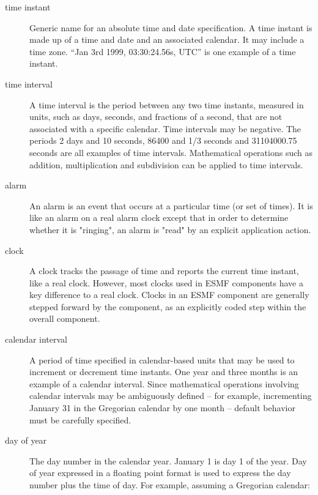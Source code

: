 \label{sec:terms}

\begin{description}

\item [time instant] \label{glos:timeinstant}
Generic name for an absolute time and date specification. A time instant is made 
up of a time and date and an associated calendar. It may include a time zone.
``Jan 3rd 1999, 03:30:24.56s, UTC'' is one example of a time instant.

\item [time interval] \label{glos:timeinterval} A time interval is the
period between any two time instants, measured in units, such as days, 
seconds, and fractions of a second, that are not associated with a specific
calendar.  Time intervals may be negative.  The periods 2 days and 10 seconds, 
86400 and 1/3 seconds and 31104000.75 seconds are all examples of time intervals.  
Mathematical operations such as addition, multiplication and subdivision 
can be applied to time intervals.
              
\item [alarm] \label{glos:alarm} An alarm is an event 
that occurs at a particular time (or set of times).  It is like an
alarm on a real alarm clock except that in order to determine whether 
it is "ringing", an alarm is "read" by an explicit application action.

\item [clock] \label{glos:clock} A clock tracks the passage of time and 
reports the current time instant, like a real clock.  However, most clocks 
used in ESMF components have a key difference to a real clock. Clocks 
in an ESMF component are generally stepped forward by the component, as an 
explicitly coded step within the overall component.

\item [calendar interval] \label{glos:timeperiod} A period of time specified
in calendar-based units that may be used to increment or decrement time instants.  
One year and three months is an example of a calendar interval.  Since 
mathematical operations involving calendar intervals may be ambiguously 
defined -- for example, incrementing January 31 in the Gregorian calendar by 
one month -- default behavior must be carefully specified.  

\item [day of year] \label{glos:dayofyear} The day number in the calendar year. 
January 1 is day 1 of the year. Day of year expressed in a floating point 
format is used to express the day number plus the time of day. 
For example, assuming a Gregorian calendar:


\end{description}
